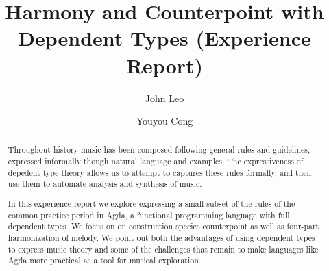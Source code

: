 \documentclass[acmsmall]{acmart}
\begin{document}
\title{Harmony and Counterpoint with Dependent Types (Experience Report)}

\author{John Leo}

\author{Youyou Cong}

\renewcommand{\shortauthors}{Leo and Cong}

\begin{abstract}

Throughout history music has been composed following general rules and
guidelines, expressed informally though natural language and
examples. The expressiveness of depedent type theory allows us to
attempt to captures these rules formally, and then use them to automate
analysis and synthesis of music.

In this experience report we explore expressing a small subset of the
rules of the common practice period in Agda, a functional programming
language with full dependent types. We focus on on construction
species counterpoint as well as four-part harmonization of melody. We
point out both the advantages of using dependent types to express
music theory and some of the challenges that remain to make
languages like Agda more practical as a tool for musical exploration.

\end{abstract}


\maketitle









\end{document}
